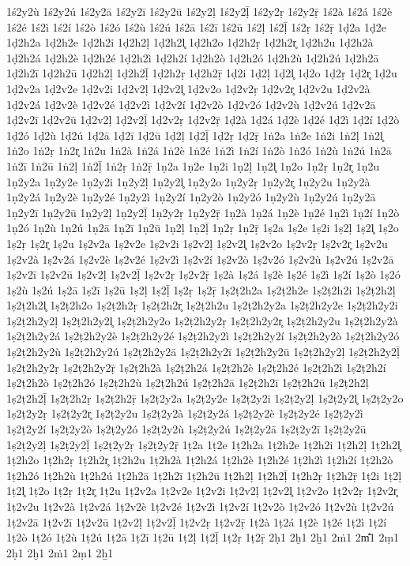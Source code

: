 {1ś2y2ù
1ś2y2ú
1ś2y2ā
1ś2y2ī
1ś2y2ū
1ś2y2ḷ
1ś2y2ḹ
1ś2y2ṛ
1ś2y2ṝ
1ś2à
1ś2á
1ś2è
1ś2é
1ś2ì
1ś2í
1ś2ò
1ś2ó
1ś2ù
1ś2ú
1ś2ā
1ś2ī
1ś2ū
1ś2ḷ
1ś2ḹ
1ś2ṛ
1ś2ṝ
1ḍ2a
1ḍ2e
1ḍ2h2a
1ḍ2h2e
1ḍ2h2i
1ḍ2h2ḷ
1ḍ2h2l̥
1ḍ2h2o
1ḍ2h2ṛ
1ḍ2h2r̥
1ḍ2h2u
1ḍ2h2à
1ḍ2h2á
1ḍ2h2è
1ḍ2h2é
1ḍ2h2ì
1ḍ2h2í
1ḍ2h2ò
1ḍ2h2ó
1ḍ2h2ù
1ḍ2h2ú
1ḍ2h2ā
1ḍ2h2ī
1ḍ2h2ū
1ḍ2h2ḷ
1ḍ2h2ḹ
1ḍ2h2ṛ
1ḍ2h2ṝ
1ḍ2i
1ḍ2ḷ
1ḍ2l̥
1ḍ2o
1ḍ2ṛ
1ḍ2r̥
1ḍ2u
1ḍ2v2a
1ḍ2v2e
1ḍ2v2i
1ḍ2v2ḷ
1ḍ2v2l̥
1ḍ2v2o
1ḍ2v2ṛ
1ḍ2v2r̥
1ḍ2v2u
1ḍ2v2à
1ḍ2v2á
1ḍ2v2è
1ḍ2v2é
1ḍ2v2ì
1ḍ2v2í
1ḍ2v2ò
1ḍ2v2ó
1ḍ2v2ù
1ḍ2v2ú
1ḍ2v2ā
1ḍ2v2ī
1ḍ2v2ū
1ḍ2v2ḷ
1ḍ2v2ḹ
1ḍ2v2ṛ
1ḍ2v2ṝ
1ḍ2à
1ḍ2á
1ḍ2è
1ḍ2é
1ḍ2ì
1ḍ2í
1ḍ2ò
1ḍ2ó
1ḍ2ù
1ḍ2ú
1ḍ2ā
1ḍ2ī
1ḍ2ū
1ḍ2ḷ
1ḍ2ḹ
1ḍ2ṛ
1ḍ2ṝ
1ṅ2a
1ṅ2e
1ṅ2i
1ṅ2ḷ
1ṅ2l̥
1ṅ2o
1ṅ2ṛ
1ṅ2r̥
1ṅ2u
1ṅ2à
1ṅ2á
1ṅ2è
1ṅ2é
1ṅ2ì
1ṅ2í
1ṅ2ò
1ṅ2ó
1ṅ2ù
1ṅ2ú
1ṅ2ā
1ṅ2ī
1ṅ2ū
1ṅ2ḷ
1ṅ2ḹ
1ṅ2ṛ
1ṅ2ṝ
1ṇ2a
1ṇ2e
1ṇ2i
1ṇ2ḷ
1ṇ2l̥
1ṇ2o
1ṇ2ṛ
1ṇ2r̥
1ṇ2u
1ṇ2y2a
1ṇ2y2e
1ṇ2y2i
1ṇ2y2ḷ
1ṇ2y2l̥
1ṇ2y2o
1ṇ2y2ṛ
1ṇ2y2r̥
1ṇ2y2u
1ṇ2y2à
1ṇ2y2á
1ṇ2y2è
1ṇ2y2é
1ṇ2y2ì
1ṇ2y2í
1ṇ2y2ò
1ṇ2y2ó
1ṇ2y2ù
1ṇ2y2ú
1ṇ2y2ā
1ṇ2y2ī
1ṇ2y2ū
1ṇ2y2ḷ
1ṇ2y2ḹ
1ṇ2y2ṛ
1ṇ2y2ṝ
1ṇ2à
1ṇ2á
1ṇ2è
1ṇ2é
1ṇ2ì
1ṇ2í
1ṇ2ò
1ṇ2ó
1ṇ2ù
1ṇ2ú
1ṇ2ā
1ṇ2ī
1ṇ2ū
1ṇ2ḷ
1ṇ2ḹ
1ṇ2ṛ
1ṇ2ṝ
1ṣ2a
1ṣ2e
1ṣ2i
1ṣ2ḷ
1ṣ2l̥
1ṣ2o
1ṣ2ṛ
1ṣ2r̥
1ṣ2u
1ṣ2v2a
1ṣ2v2e
1ṣ2v2i
1ṣ2v2ḷ
1ṣ2v2l̥
1ṣ2v2o
1ṣ2v2ṛ
1ṣ2v2r̥
1ṣ2v2u
1ṣ2v2à
1ṣ2v2á
1ṣ2v2è
1ṣ2v2é
1ṣ2v2ì
1ṣ2v2í
1ṣ2v2ò
1ṣ2v2ó
1ṣ2v2ù
1ṣ2v2ú
1ṣ2v2ā
1ṣ2v2ī
1ṣ2v2ū
1ṣ2v2ḷ
1ṣ2v2ḹ
1ṣ2v2ṛ
1ṣ2v2ṝ
1ṣ2à
1ṣ2á
1ṣ2è
1ṣ2é
1ṣ2ì
1ṣ2í
1ṣ2ò
1ṣ2ó
1ṣ2ù
1ṣ2ú
1ṣ2ā
1ṣ2ī
1ṣ2ū
1ṣ2ḷ
1ṣ2ḹ
1ṣ2ṛ
1ṣ2ṝ
1ṣ2ṭ2h2a
1ṣ2ṭ2h2e
1ṣ2ṭ2h2i
1ṣ2ṭ2h2ḷ
1ṣ2ṭ2h2l̥
1ṣ2ṭ2h2o
1ṣ2ṭ2h2ṛ
1ṣ2ṭ2h2r̥
1ṣ2ṭ2h2u
1ṣ2ṭ2h2y2a
1ṣ2ṭ2h2y2e
1ṣ2ṭ2h2y2i
1ṣ2ṭ2h2y2ḷ
1ṣ2ṭ2h2y2l̥
1ṣ2ṭ2h2y2o
1ṣ2ṭ2h2y2ṛ
1ṣ2ṭ2h2y2r̥
1ṣ2ṭ2h2y2u
1ṣ2ṭ2h2y2à
1ṣ2ṭ2h2y2á
1ṣ2ṭ2h2y2è
1ṣ2ṭ2h2y2é
1ṣ2ṭ2h2y2ì
1ṣ2ṭ2h2y2í
1ṣ2ṭ2h2y2ò
1ṣ2ṭ2h2y2ó
1ṣ2ṭ2h2y2ù
1ṣ2ṭ2h2y2ú
1ṣ2ṭ2h2y2ā
1ṣ2ṭ2h2y2ī
1ṣ2ṭ2h2y2ū
1ṣ2ṭ2h2y2ḷ
1ṣ2ṭ2h2y2ḹ
1ṣ2ṭ2h2y2ṛ
1ṣ2ṭ2h2y2ṝ
1ṣ2ṭ2h2à
1ṣ2ṭ2h2á
1ṣ2ṭ2h2è
1ṣ2ṭ2h2é
1ṣ2ṭ2h2ì
1ṣ2ṭ2h2í
1ṣ2ṭ2h2ò
1ṣ2ṭ2h2ó
1ṣ2ṭ2h2ù
1ṣ2ṭ2h2ú
1ṣ2ṭ2h2ā
1ṣ2ṭ2h2ī
1ṣ2ṭ2h2ū
1ṣ2ṭ2h2ḷ
1ṣ2ṭ2h2ḹ
1ṣ2ṭ2h2ṛ
1ṣ2ṭ2h2ṝ
1ṣ2ṭ2y2a
1ṣ2ṭ2y2e
1ṣ2ṭ2y2i
1ṣ2ṭ2y2ḷ
1ṣ2ṭ2y2l̥
1ṣ2ṭ2y2o
1ṣ2ṭ2y2ṛ
1ṣ2ṭ2y2r̥
1ṣ2ṭ2y2u
1ṣ2ṭ2y2à
1ṣ2ṭ2y2á
1ṣ2ṭ2y2è
1ṣ2ṭ2y2é
1ṣ2ṭ2y2ì
1ṣ2ṭ2y2í
1ṣ2ṭ2y2ò
1ṣ2ṭ2y2ó
1ṣ2ṭ2y2ù
1ṣ2ṭ2y2ú
1ṣ2ṭ2y2ā
1ṣ2ṭ2y2ī
1ṣ2ṭ2y2ū
1ṣ2ṭ2y2ḷ
1ṣ2ṭ2y2ḹ
1ṣ2ṭ2y2ṛ
1ṣ2ṭ2y2ṝ
1ṭ2a
1ṭ2e
1ṭ2h2a
1ṭ2h2e
1ṭ2h2i
1ṭ2h2ḷ
1ṭ2h2l̥
1ṭ2h2o
1ṭ2h2ṛ
1ṭ2h2r̥
1ṭ2h2u
1ṭ2h2à
1ṭ2h2á
1ṭ2h2è
1ṭ2h2é
1ṭ2h2ì
1ṭ2h2í
1ṭ2h2ò
1ṭ2h2ó
1ṭ2h2ù
1ṭ2h2ú
1ṭ2h2ā
1ṭ2h2ī
1ṭ2h2ū
1ṭ2h2ḷ
1ṭ2h2ḹ
1ṭ2h2ṛ
1ṭ2h2ṝ
1ṭ2i
1ṭ2ḷ
1ṭ2l̥
1ṭ2o
1ṭ2ṛ
1ṭ2r̥
1ṭ2u
1ṭ2v2a
1ṭ2v2e
1ṭ2v2i
1ṭ2v2ḷ
1ṭ2v2l̥
1ṭ2v2o
1ṭ2v2ṛ
1ṭ2v2r̥
1ṭ2v2u
1ṭ2v2à
1ṭ2v2á
1ṭ2v2è
1ṭ2v2é
1ṭ2v2ì
1ṭ2v2í
1ṭ2v2ò
1ṭ2v2ó
1ṭ2v2ù
1ṭ2v2ú
1ṭ2v2ā
1ṭ2v2ī
1ṭ2v2ū
1ṭ2v2ḷ
1ṭ2v2ḹ
1ṭ2v2ṛ
1ṭ2v2ṝ
1ṭ2à
1ṭ2á
1ṭ2è
1ṭ2é
1ṭ2ì
1ṭ2í
1ṭ2ò
1ṭ2ó
1ṭ2ù
1ṭ2ú
1ṭ2ā
1ṭ2ī
1ṭ2ū
1ṭ2ḷ
1ṭ2ḹ
1ṭ2ṛ
1ṭ2ṝ
2ḥ1
2ḫ1
2ẖ1
2ṁ1
2m̐1
2ṃ1
2ḥ1
2ḫ1
2ṁ1
2ṃ1
2ẖ1
}
\endgroup
